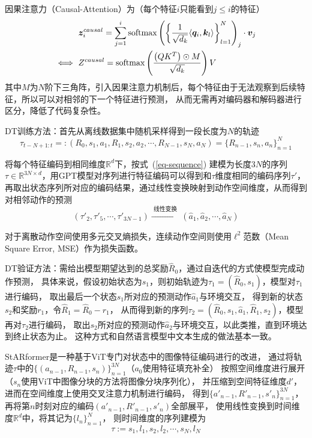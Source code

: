 因果注意力（Causal-Attention）为（每个特征$i$只能看到$j\leqslant i$的特征）
\begin{equation}\label{eq-causal-attn}
\begin{aligned}
  &\ \boldsymbol{z}^{causal}_i = \sum_{j=1}^i\text{softmax}\left(\left\{\frac{1}{\sqrt{d_k}}\langle \boldsymbol{q}_i,\boldsymbol{k}_l\rangle \right\}_{l=1}^N\right)_j\cdot \boldsymbol{v}_j\\
  \iff &\ Z^{causal} = \text{softmax}\left(\frac{\left(QK^T\right)\odot M}{\sqrt{d_k}}\right)V
\end{aligned}
\end{equation}
其中$M$为$N$阶下三角阵，引入因果注意力机制后，每个特征由于无法观察到后续特征，所以可以对相邻的下一个特征进行预测，
从而无需再对编码器和解码器进行区分，降低了代码复杂性。

DT训练方法：首先从离线数据集中随机采样得到一段长度为$N$的轨迹
\begin{equation}
  \tau_{t-N+1:t} =: (R_0,s_1,a_1,R_1,s_2,a_2,\cdots,R_{N-1},s_N,a_N) = \{R_{n-1},s_n,a_n\}_{n=1}^N
\end{equation}

将每个特征编码到相同维度$\mathbb{R}^d$下，按式~(\ref{eq-sequence})
建模为长度$3N$的序列$\tau\in\mathbb{R}^{3N\times d}$，用GPT模型对序列进行特征编码可以得到和$\tau$维度相同的编码序列$\tau'$，
再取出状态序列所对应的编码结果，通过线性变换映射到动作空间维度，从而得到对相邻动作的预测
\begin{equation}
  (\tau'_2,\tau'_5,\cdots, \tau'_{3N-1})\xrightarrow{\text{~线性变换~}}
  (\hat{a}_1,\hat{a}_2,\cdots,  \hat{a}_{N})
\end{equation}

对于离散动作空间使用多元交叉熵损失，连续动作空间则使用$\ell^2$范数（Mean Square Error, MSE）作为损失函数。

DT验证方法：需给出模型期望达到的总奖励$\hat{R}_0$，通过自迭代的方式使模型完成动作预测，
具体来说，假设初始状态为$s_1$，则初始轨迹为$\tau_1=(\hat{R}_0,s_1)$，模型对$\tau_1$进行编码，
取出最后一个状态$s_1$所对应的预测动作$\hat{a}_1$与环境交互，
得到新的状态$s_2$和奖励$r_1$，令$\hat{R}_1 = \hat{R}_0 - r_1$，
从而得到新的序列$\tau_2 = (\hat{R}_0,s_1,\hat{a}_1, \hat{R}_1, s_2)$，模型再对$\tau_2$进行编码，
取出$s_2$所对应的预测动作$\hat{a}_2$与环境交互，以此类推，直到环境达到终止状态为止。
这种方式和自然语言模型中文本生成的做法基本一致。

StARformer是一种基于ViT专门对状态中的图像特征编码进行的改进，
通过将轨迹$\tau$中的$\{(a_{n-1},R_{n-1},s_{n})\}_{n=1}^{3N}$（$a_0$使用特征填充补全）
按照空间维度进行展开（$s_{n}$使用ViT中图像分块的方法将图像分块序列化），
并压缩到空间特征维度$d'$，进而在空间维度上使用交叉注意力机制进行编码，
得到$\{a'_{n-1},R'_{n-1},s'_{n}\}_{n=1}^{3N}$，
再将第$n$时刻对应的编码$(a'_{n-1},R'_{n-1},s'_{n})$全部展平，
使用线性变换到时间维度$\mathbb{R}^d$中，将其记为$\{l_{n}\}_{n=1}^N$，
则时间维度的序列建模为
\begin{equation}
  \tau:=s_1,l_1,s_2,l_2,\cdots,s_N,l_N
\end{equation}

